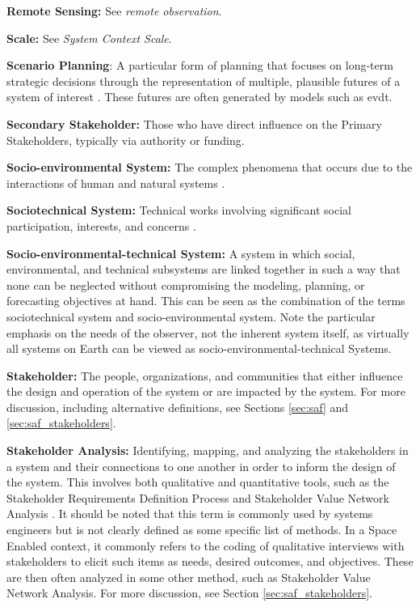 \textbf{Remote Sensing:} See \textit{remote observation}.

\textbf{Scale:} See \textit{System Context Scale}.

\textbf{Scenario Planning}: A particular form of planning that focuses on long-term strategic decisions through the representation of multiple, plausible futures of a system of interest \cite{goodspeedScenarioPlanningCities2020}. These futures are often generated by models such as \ac{evdt}.

\textbf{Secondary Stakeholder:} Those who have direct influence on the Primary Stakeholders, typically via authority or funding.

\textbf{Socio-environmental System:} The complex phenomena that occurs due to the interactions of human and natural systems \cite{elsawahEightGrandChallenges2020}.

\textbf{Sociotechnical System:} Technical works involving significant social participation, interests, and concerns \cite{maierArtSystemsArchitecting2009}.

\textbf{Socio-environmental-technical System:} A system in which social, environmental, and technical subsystems are linked together in such a way that none can be neglected without compromising the modeling, planning, or forecasting objectives at hand. This can be seen as the combination of the terms sociotechnical system and socio-environmental system. Note the particular emphasis on the needs of the observer, not the inherent system itself, as virtually all systems on Earth can be viewed as socio-environmental-technical Systems.

\textbf{Stakeholder:} The people, organizations, and communities that either influence the design and operation of the system or are impacted by the system. For more discussion, including alternative definitions, see Sections \ref{sec:saf} and \ref{sec:saf_stakeholders}.

\textbf{Stakeholder Analysis:} Identifying, mapping, and analyzing the stakeholders in a system and their connections to one another in order to inform the design of the system. This involves both qualitative and quantitative tools, such as the Stakeholder Requirements Definition Process \cite{incoseINCOSESystemsEngineering2015} and Stakeholder Value Network Analysis \cite{fengDependencyStructureMatrix2010a}. It should be noted that this term is commonly used by systems engineers but is not clearly defined as some specific list of methods. In a Space Enabled context, it commonly refers to the coding of qualitative interviews with stakeholders to elicit such items as needs, desired outcomes, and objectives. These are then often analyzed in some other method, such as Stakeholder Value Network Analysis. For more discussion, see Section \ref{sec:saf_stakeholders}.

